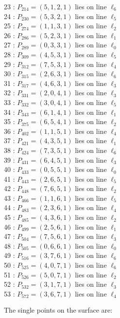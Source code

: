 \documentclass{article}
\begin{document}
{\begin{multicols}{2}
23 : $P_{214}=( 5, 1, 2, 1 )$ lies on line $\ell_{6}$\\
24 : $P_{230}=( 5, 3, 2, 1 )$ lies on line $\ell_{5}$\\
25 : $P_{274}=( 1, 1, 3, 1 )$ lies on line $\ell_{2}$\\
26 : $P_{286}=( 5, 2, 3, 1 )$ lies on line $\ell_{1}$\\
27 : $P_{289}=( 0, 3, 3, 1 )$ lies on line $\ell_{0}$\\
28 : $P_{309}=( 4, 5, 3, 1 )$ lies on line $\ell_{5}$\\
29 : $P_{312}=( 7, 5, 3, 1 )$ lies on line $\ell_{4}$\\
30 : $P_{315}=( 2, 6, 3, 1 )$ lies on line $\ell_{6}$\\
31 : $P_{317}=( 4, 6, 3, 1 )$ lies on line $\ell_{3}$\\
32 : $P_{331}=( 2, 0, 4, 1 )$ lies on line $\ell_{3}$\\
33 : $P_{332}=( 3, 0, 4, 1 )$ lies on line $\ell_{5}$\\
34 : $P_{343}=( 6, 1, 4, 1 )$ lies on line $\ell_{1}$\\
35 : $P_{375}=( 6, 5, 4, 1 )$ lies on line $\ell_{2}$\\
36 : $P_{402}=( 1, 1, 5, 1 )$ lies on line $\ell_{4}$\\
37 : $P_{421}=( 4, 3, 5, 1 )$ lies on line $\ell_{1}$\\
38 : $P_{424}=( 7, 3, 5, 1 )$ lies on line $\ell_{6}$\\
39 : $P_{431}=( 6, 4, 5, 1 )$ lies on line $\ell_{3}$\\
40 : $P_{433}=( 0, 5, 5, 1 )$ lies on line $\ell_{0}$\\
41 : $P_{443}=( 2, 6, 5, 1 )$ lies on line $\ell_{5}$\\
42 : $P_{448}=( 7, 6, 5, 1 )$ lies on line $\ell_{2}$\\
43 : $P_{466}=( 1, 1, 6, 1 )$ lies on line $\ell_{5}$\\
44 : $P_{483}=( 2, 3, 6, 1 )$ lies on line $\ell_{4}$\\
45 : $P_{485}=( 4, 3, 6, 1 )$ lies on line $\ell_{2}$\\
46 : $P_{499}=( 2, 5, 6, 1 )$ lies on line $\ell_{1}$\\
47 : $P_{504}=( 7, 5, 6, 1 )$ lies on line $\ell_{3}$\\
48 : $P_{505}=( 0, 6, 6, 1 )$ lies on line $\ell_{0}$\\
49 : $P_{516}=( 3, 7, 6, 1 )$ lies on line $\ell_{6}$\\
50 : $P_{525}=( 4, 0, 7, 1 )$ lies on line $\ell_{6}$\\
51 : $P_{526}=( 5, 0, 7, 1 )$ lies on line $\ell_{2}$\\
52 : $P_{532}=( 3, 1, 7, 1 )$ lies on line $\ell_{3}$\\
53 : $P_{572}=( 3, 6, 7, 1 )$ lies on line $\ell_{4}$\\
\end{multicols}
The single points on the surface are:\\
}
\end{document}
